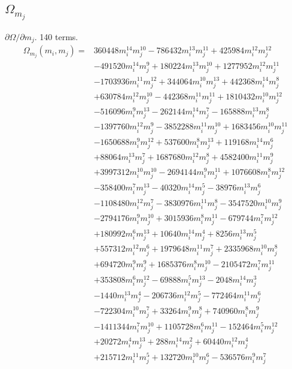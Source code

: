\subsection*{$\Omega_{m_j}$}
$\partial\Omega/\partial m_j$. 140 terms.
{\small
\begin{align*}
\Omega_{m_j}(m_i,m_j)={}&360448m_i^{14}m_j^{10}-786432m_i^{13}m_j^{11}+425984m_i^{12}m_j^{12}\\
&-491520m_i^{14}m_j^{9}+180224m_i^{13}m_j^{10}+1277952m_i^{12}m_j^{11}\\
&-1703936m_i^{11}m_j^{12}+344064m_i^{10}m_j^{13}+442368m_i^{14}m_j^{8}\\
&+630784m_i^{12}m_j^{10}-442368m_i^{11}m_j^{11}+1810432m_i^{10}m_j^{12}\\
&-516096m_i^{9}m_j^{13}-262144m_i^{14}m_j^{7}-165888m_i^{13}m_j^{8}\\
&-1397760m_i^{12}m_j^{9}-3852288m_i^{11}m_j^{10}+1683456m_i^{10}m_j^{11}\\
&-1650688m_i^{9}m_j^{12}+537600m_i^{8}m_j^{13}+119168m_i^{14}m_j^{6}\\
&+88064m_i^{13}m_j^{7}+1687680m_i^{12}m_j^{8}+4582400m_i^{11}m_j^{9}\\
&+3997312m_i^{10}m_j^{10}-2694144m_i^{9}m_j^{11}+1076608m_i^{8}m_j^{12}\\
&-358400m_i^{7}m_j^{13}-40320m_i^{14}m_j^{5}-38976m_i^{13}m_j^{6}\\
&-1108480m_i^{12}m_j^{7}-3830976m_i^{11}m_j^{8}-3547520m_i^{10}m_j^{9}\\
&-2794176m_i^{9}m_j^{10}+3015936m_i^{8}m_j^{11}-679744m_i^{7}m_j^{12}\\
&+180992m_i^{6}m_j^{13}+10640m_i^{14}m_j^{4}+8256m_i^{13}m_j^{5}\\
&+557312m_i^{12}m_j^{6}+1979648m_i^{11}m_j^{7}+2335968m_i^{10}m_j^{8}\\
&+694720m_i^{9}m_j^{9}+1685376m_i^{8}m_j^{10}-2105472m_i^{7}m_j^{11}\\
&+353808m_i^{6}m_j^{12}-69888m_i^{5}m_j^{13}-2048m_i^{14}m_j^{3}\\
&-1440m_i^{13}m_j^{4}-206736m_i^{12}m_j^{5}-772464m_i^{11}m_j^{6}\\
&-722304m_i^{10}m_j^{7}+33264m_i^{9}m_j^{8}+740960m_i^{8}m_j^{9}\\
&-1411344m_i^{7}m_j^{10}+1105728m_i^{6}m_j^{11}-152464m_i^{5}m_j^{12}\\
&+20272m_i^{4}m_j^{13}+288m_i^{14}m_j^{2}+60440m_i^{12}m_j^{4}\\
&+215712m_i^{11}m_j^{5}+132720m_i^{10}m_j^{6}-536576m_i^{9}m_j^{7}\\

\end{align*}}
